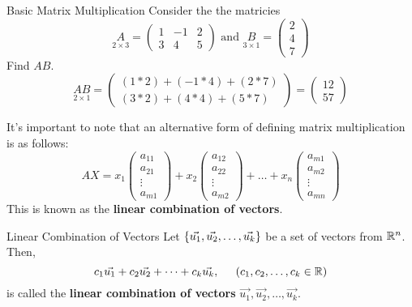 \begin{example}{Basic Matrix Multiplication}{}
    Consider the the matricies 
    \[ 
        \underset{2 \times 3}{A} = 
        \begin{pmatrix}
            1 & -1 & 2 \\
            3 & 4 & 5 
        \end{pmatrix} 
        \text{ and }
        \underset{3 \times 1}{B} = 
        \begin{pmatrix}
            2 \\
            4 \\
            7
        \end{pmatrix}
    \]
    Find $AB$.
    \[ 
        \underset{2 \times 1}{AB} = 
        \begin{pmatrix}
            (1 * 2) + (-1 * 4) + (2 * 7) \\
            (3 * 2) + (4 * 4) + (5 * 7) 
        \end{pmatrix}
        = 
        \begin{pmatrix}
            12 \\
            57
        \end{pmatrix}
    \]
\end{example}

It's important to note that an alternative form of defining matrix multiplication is as follows:
\[
    AX = 
    x_1\begin{pmatrix}
        a_{11} \\ a_{21} \\ \vdots \\ a_{m1}
    \end{pmatrix}
    + x_2\begin{pmatrix}
        a_{12} \\ a_{22} \\ \vdots \\ a_{m2}
    \end{pmatrix}
    + \dots + 
    x_n\begin{pmatrix}
        a_{m1} \\ a_{m2} \\ \vdots \\ a_{mn}
    \end{pmatrix}
\]
This is known as the \textbf{linear combination of vectors}.

\begin{defbox}{Linear Combination of Vectors}{}
    Let $\left\{\vec{u_1}, \vec{u_2}, \dots, \vec{u_k} \right\}$ be a set of vectors from $\mathbb R^{n}$. Then, 
    \[
        c_1\vec{u_1} + c_2\vec{u_2} + \dots + c_k\vec{u_k}, \hspace{0.2in} (c_1, c_2, \dots, c_k \in \mathbb R) 
    \]
    is called the \textbf{linear combination of vectors} $\vec{u_1}, \vec{u_2}, \dots, \vec{u_k}$.
\end{defbox}

